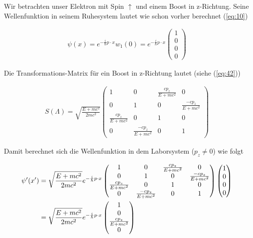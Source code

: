 Wir betrachten unser Elektron mit Spin \(\uparrow\) und einem Boost in z-Richtung. Seine Wellenfunktion in seinem Ruhesystem lautet wie schon vorher berechnet (\ref{eq:10})

\begin{align}
  \label{eq:44}
    \psi(x) = e^{-\frac{i}{\hbar}p\cdot x }w_1(0) = e^{-\frac{i}{\hbar}p\cdot x  }
    \begin{pmatrix}
      1\\0\\0\\0
    \end{pmatrix}
\end{align}

 Die Transformations-Matrix für ein Boost in z-Richtung lautet (siehe (\ref{eq:42}))

 \begin{align}
   \label{eq:45}
    S(\Lambda)=\sqrt{\frac{E + mc^2}{2mc^2}}
  \begin{pmatrix}
    1&0&\frac{cp_z}{E+mc^2}&0\\[2ex]
    0&1&0&\frac{-cp_z}{E+mc^2}\\[2ex]
    \frac{cp_z}{E+mc^2}&0&1&0\\[2ex]
    0&\frac{-cp_z}{E+mc^2}&0&1
  \end{pmatrix}
 \end{align}

Damit berechnet sich die Wellenfunktion in dem Laborsystem (\(p_z\ne 0\)) wie folgt

\begin{align}
  \label{eq:46}
  \psi'(x') &=\sqrt{\frac{E + mc^2}{2mc^2}}e^{-\frac{i}{\hbar}p\cdot x  }
  \begin{pmatrix}
    1&0&\frac{cp_z}{E+mc^2}&0\\
    0&1&0&\frac{-cp_z}{E+mc^2}\\
    \frac{cp_z}{E+mc^2}&0&1&0\\
    0&\frac{-cp_z}{E+mc^2}&0&1
  \end{pmatrix}
    \begin{pmatrix}
      1\\0\\0\\0
    \end{pmatrix}\notag\\
&=\sqrt{\frac{E + mc^2}{2mc^2}}e^{-\frac{i}{\hbar}p\cdot x  }
   \begin{pmatrix}
      1\\0\\\frac{cp_z}{E+mc^2}\\0
    \end{pmatrix}
\end{align}

